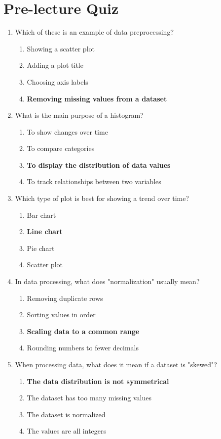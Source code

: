 \newpage

\section{Pre-lecture Quiz}

\begin{enumerate}
    \item Which of these is an example of data preprocessing?
    \begin{enumerate}
        \item Showing a scatter plot
        \item Adding a plot title
        \item Choosing axis labels
        \item \textbf{Removing missing values from a dataset}
    \end{enumerate}

    \item What is the main purpose of a histogram?
    \begin{enumerate}
        \item To show changes over time
        \item To compare categories
        \item \textbf{To display the distribution of data values}
        \item To track relationships between two variables
    \end{enumerate}

    \item Which type of plot is best for showing a trend over time?
    \begin{enumerate}
        \item Bar chart
        \item \textbf{Line chart}
        \item Pie chart
        \item Scatter plot
    \end{enumerate}

    \item In data processing, what does "normalization" usually mean?
    \begin{enumerate}
        \item Removing duplicate rows
        \item Sorting values in order
        \item \textbf{Scaling data to a common range}
        \item Rounding numbers to fewer decimals
    \end{enumerate}

    \item When processing data, what does it mean if a dataset is "skewed"?
    \begin{enumerate}
        \item \textbf{The data distribution is not symmetrical}
        \item The dataset has too many missing values
        \item The dataset is normalized
        \item The values are all integers
    \end{enumerate}
\end{enumerate}

\newpage

